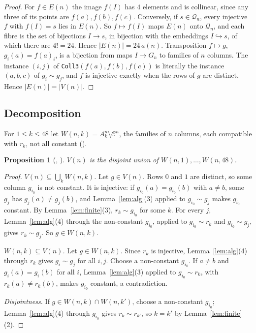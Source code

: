 \documentclass[11pt]{amsart}
\theoremstyle{plain}
\newtheorem{proposition}[theorem]{Proposition}
\theoremstyle{definition}
\newcommand{\cQ}{\mathcal{Q}}
\newcommand{\cC}{\mathcal{C}}
\begin{document}
\begin{proof}
For $f\in E(n)$ the image $f(I)$ has $4$ elements and is collinear, since any three of its points are $f(a),f(b),f(c)$. Conversely, if $s\in\cQ_n$, every injective $f$ with $f(I)=s$ lies in $E(n)$. So $f\mapsto f(I)$ maps $E(n)$ onto $\cQ_n$, and each fibre is the set of bijections $I\to s$, in bijection with the embeddings $I\hookrightarrow s$, of which there are $4!=24$. Hence $|E(n)|=24\,a(n)$.
Transposition $f\mapsto g$, $g_i(a)=f(a)_i$, is a bijection from maps $I\to G_n$ to families of $n$ columns. The instance $(i,j)$ of \texttt{Coll3}$(f(a),f(b),f(c))$ is literally the instance $(a,b,c)$ of $g_i\sim g_j$, and $f$ is injective exactly when the rows of $g$ are distinct. Hence $|E(n)|=|V(n)|$.
\end{proof}

\subsection{Decomposition}
For $1\le k\le48$ let $W(n,k)=A_k^n\setminus\cC^n$, the families of $n$ columns, each compatible with $r_k$, not all constant ().

\begin{proposition}[, ]\label{prop:decomp}
$V(n)$ is the disjoint union of $W(n,1),\dots,W(n,48)$.
\end{proposition}

\begin{proof}
\emph{$V(n)\subseteq\bigcup_k W(n,k)$.} Let $g\in V(n)$. Rows $0$ and $1$ are distinct, so some column $g_{i_0}$ is not constant. It is injective: if $g_{i_0}(a)=g_{i_0}(b)$ with $a\ne b$, some $g_j$ has $g_j(a)\ne g_j(b)$, and Lemma~\ref{lem:alg}(3) applied to $g_{i_0}\sim g_j$ makes $g_{i_0}$ constant. By Lemma~\ref{lem:finite}(3), $r_k\sim g_{i_0}$ for some $k$. For every $j$, Lemma~\ref{lem:alg}(4) through the non-constant $g_{i_0}$, applied to $g_{i_0}\sim r_k$ and $g_{i_0}\sim g_j$, gives $r_k\sim g_j$. So $g\in W(n,k)$.

\emph{$W(n,k)\subseteq V(n)$.} Let $g\in W(n,k)$. Since $r_k$ is injective, Lemma~\ref{lem:alg}(4) through $r_k$ gives $g_i\sim g_j$ for all $i,j$. Choose a non-constant $g_{i_0}$. If $a\ne b$ and $g_i(a)=g_i(b)$ for all $i$, Lemma~\ref{lem:alg}(3) applied to $g_{i_0}\sim r_k$, with $r_k(a)\ne r_k(b)$, makes $g_{i_0}$ constant, a contradiction.

\emph{Disjointness.} If $g\in W(n,k)\cap W(n,k')$, choose a non-constant $g_{i_0}$; Lemma~\ref{lem:alg}(4) through $g_{i_0}$ gives $r_k\sim r_{k'}$, so $k=k'$ by Lemma~\ref{lem:finite}(2).
\end{proof}
\end{document}

